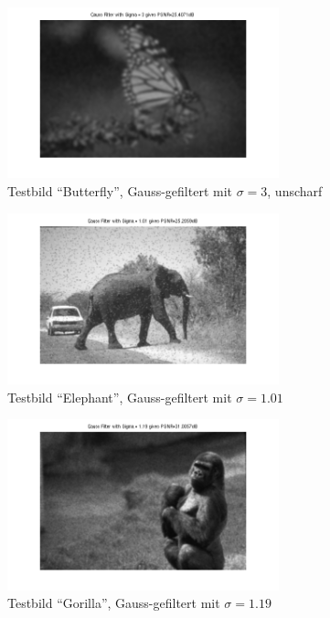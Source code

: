 \begin{figure}[htb]
 \centering
 \includegraphics[width=0.7\textwidth]{../images_out/t2_b_g3_smooth.png}
 \caption{Testbild ``Butterfly'', Gauss-gefiltert mit $\sigma=3$, unscharf}
 \label{fig:t2_b_g3_smooth}
\end{figure}

\begin{figure}[htb]
 \centering
 \includegraphics[width=0.7\textwidth]{../images_out/t2_e_g101.png}
 \caption{Testbild ``Elephant'', Gauss-gefiltert mit $\sigma=1.01$}
 \label{fig:t2_e_g101}
\end{figure}

\begin{figure}[htb]
 \centering
 \includegraphics[width=0.7\textwidth]{../images_out/t2_g_g119.png}
 \caption{Testbild ``Gorilla'', Gauss-gefiltert mit $\sigma=1.19$}
 \label{fig:t2_g_g119}
\end{figure}

